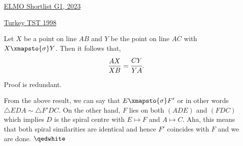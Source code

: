 \begin{problem}{14}{\href{https://artofproblemsolving.com/community/c6h3100572p28033718}{ELMO Shortlist G1, 2023}}
\begin{problem}{9}{\href{https://artofproblemsolving.com/community/q2h449171p35492771}{Turkey TST 1998}}
\begin{numsolution}{2}
	\begin{proposition}{1} Let $X$ be a point on line $AB$ and $Y$ be the point on line $AC$ with $X\xmapsto{\sigma}Y$. Then it follows that,
$$\frac{AX}{XB}=\cfrac{CY}{YA}.$$
	\end{proposition}
	\noindent Proof is redundant.

	\par From the above result, we can say that $E\xmapsto{\sigma} F'$ or in other words $\triangle EDA\sim \triangle F'DC$. On the other hand, $F$ lies on both $(ADE)$ and $(FDC)$ which implies $D$ is the spiral centre with $E\mapsto F$ and $A\mapsto C$. Aha, this means that both spiral similarities are identical and hence $F'$ coincides with $F$ and we are done. $\qedwhite$
	\end{numsolution}
\end{problem}
	

\end{problem}
